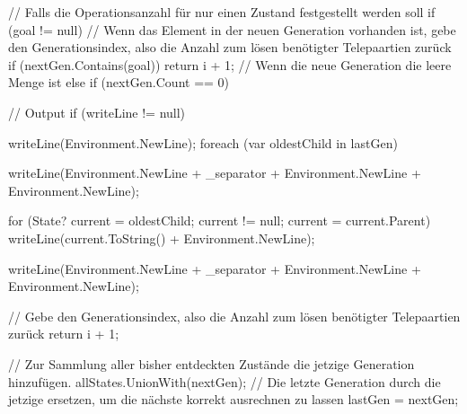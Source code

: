 \documentclass[a4paper,10pt,ngerman]{scrartcl}
\begin{document}
\begin{lstcs}
{{{            // Falls die Operationsanzahl für nur einen Zustand festgestellt werden soll
            if (goal != null)
            {
                // Wenn das Element in der neuen Generation vorhanden ist, gebe den Generationsindex, also die Anzahl zum lösen benötigter Telepaartien zurück
                if (nextGen.Contains(goal)) return i + 1;
            }
            // Wenn die neue Generation die leere Menge ist
            else if (nextGen.Count == 0)
            {
                // Output
                if (writeLine != null)
                {
                    writeLine(Environment.NewLine);
                    foreach (var oldestChild in lastGen)
                    {
                        writeLine(Environment.NewLine + _separator + Environment.NewLine + Environment.NewLine);

                        for (State? current = oldestChild; current != null; current = current.Parent)
                        {
                            writeLine(current.ToString() + Environment.NewLine);
                        }
                    }

                    writeLine(Environment.NewLine + _separator + Environment.NewLine + Environment.NewLine);
                }

                // Gebe den Generationsindex, also die Anzahl zum lösen benötigter Telepaartien zurück
                return i + 1;
            }

            // Zur Sammlung aller bisher entdeckten Zustände die jetzige Generation hinzufügen.
            allStates.UnionWith(nextGen);
            // Die letzte Generation durch die jetzige ersetzen, um die nächste korrekt ausrechnen zu lassen
            lastGen = nextGen;
        }
    }
}
\end{lstcs}
\end{document}
